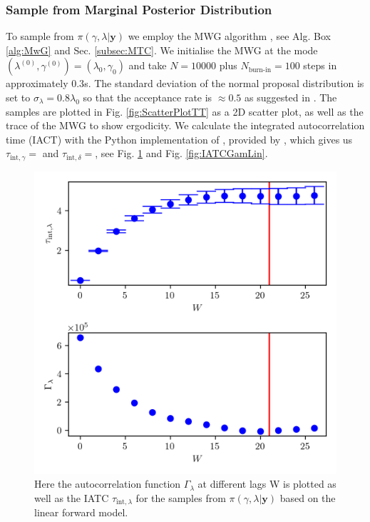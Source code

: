 \subsubsection{Sample from Marginal Posterior Distribution}
\label{subsec:firstMarg}
To sample from $\pi(\gamma, \lambda| \bm{y})$ we employ the MWG algorithm , see Alg. Box \ref{alg:MwG} and Sec. \ref{subsec:MTC}.
We initialise the MWG at the mode $(\lambda^{(0)} , \gamma^{(0)}  ) = ( \lambda_{0} , \gamma_{0}  )$ and take $N = 10000$ plus $N_{\text{burn-in}} = 100$ steps in approximately $0.3$s.
The standard deviation of the normal proposal distribution is set to $\sigma_{\lambda} = 0.8 \lambda_0$ so that the acceptance rate is $\approx 0.5$ as suggested in \cite{robertsLecNot}.
The samples are plotted in Fig. \ref{fig:ScatterPlotTT} as a 2D scatter plot, as well as the trace of the MWG to show ergodicity.
We calculate the integrated autocorrelation time (IACT) with the Python implementation of \cite{wolff2004monte}, provided by \cite{drikHesse}, which gives us $\tau_{\text{int}, \gamma} = $ and $\tau_{\text{int}, \delta} = $, see Fig. \ref{fig:IATCLamLin} and Fig. \ref{fig:IATCGamLin}.
\begin{figure}[ht!]
	\centering
	\includegraphics{UwerrTauIntFirstO3lam.png}
	\caption[IATC of $\lambda$ samples from $\pi(\gamma, \lambda| \bm{y})$, for linear model.]{Here the autocorrelation function $\Gamma_{\lambda}$ at different lags W is plotted as well as the IATC $\tau_{\text{int},\lambda}$ for the samples from $\pi(\gamma, \lambda| \bm{y})$ based on the linear forward model.}
	\label{fig:IATCLamLin}
\end{figure}
